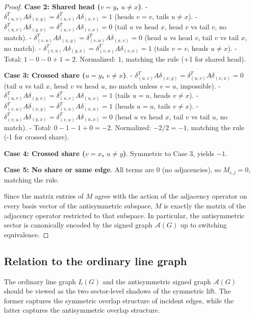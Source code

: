 \documentclass[11pt]{article}
\theoremstyle{plain}
\begin{document}
\begin{proof}
\textbf{Case 2: Shared head ($v = y$, $u \neq x$)}.  
- $\delta_{(u,v)}^T A \delta_{(x,y)} = \delta_{(u,v)}^T A \delta_{(x,v)} = 1$ (heads $v = v$, tails $u \neq x$).
- $\delta_{(u,v)}^T A \delta_{(y,x)} = \delta_{(u,v)}^T A \delta_{(v,x)} = 0$ (tail $u$ vs head $x$, head $v$ vs tail $v$, no match).
- $\delta_{(v,u)}^T A \delta_{(x,y)} = \delta_{(v,u)}^T A \delta_{(x,v)} = 0$ (head $u$ vs head $v$, tail $v$ vs tail $x$, no match).
- $\delta_{(v,u)}^T A \delta_{(y,x)} = \delta_{(v,u)}^T A \delta_{(v,x)} = 1$ (tails $v = v$, heads $u \neq x$).
- Total: $1 - 0 - 0 + 1 = 2$. Normalized: $1$, matching the rule (+1 for shared head).

\textbf{Case 3: Crossed share ($u = y$, $v \neq x$)}.  
- $\delta_{(u,v)}^T A \delta_{(x,y)} = \delta_{(u,v)}^T A \delta_{(x,u)} = 0$ (tail $u$ vs tail $x$, head $v$ vs head $u$, no match unless $v = u$, impossible).
- $\delta_{(u,v)}^T A \delta_{(y,x)} = \delta_{(u,v)}^T A \delta_{(u,x)} = 1$ (tails $u = u$, heads $v \neq x$).
- $\delta_{(v,u)}^T A \delta_{(x,y)} = \delta_{(v,u)}^T A \delta_{(x,u)} = 1$ (heads $u = u$, tails $v \neq x$).
- $\delta_{(v,u)}^T A \delta_{(y,x)} = \delta_{(v,u)}^T A \delta_{(u,x)} = 0$ (head $u$ vs head $x$, tail $v$ vs tail $u$, no match).
- Total: $0 - 1 - 1 + 0 = -2$. Normalized: $-2/2 = -1$, matching the rule (-1 for crossed share).

\textbf{Case 4: Crossed share ($v = x$, $u \neq y$)}. Symmetric to Case 3, yields $-1$.

\textbf{Case 5: No share or same edge}. All terms are 0 (no adjacencies), so $M_{i,j} = 0$, matching the rule.

Since the matrix entries of $M$ agree with the action of the adjacency operator on every basis vector
of the antisymmetric subspace, $M$ is exactly the matrix of the adjacency operator restricted to that
subspace. In particular, the antisymmetric sector is canonically encoded by the signed graph
$\mathcal A(G)$ up to switching equivalence.
\end{proof}

\subsection{Relation to the ordinary line graph}\label{subsec:connection-line-graph}

The ordinary line graph \(L(G)\) and the antisymmetric signed graph \(\mathcal A(G)\) should be viewed as the
two sector-level shadows of the symmetric lift. The former captures the symmetric overlap structure of incident
edges, while the latter captures the antisymmetric overlap structure.
\end{document}
